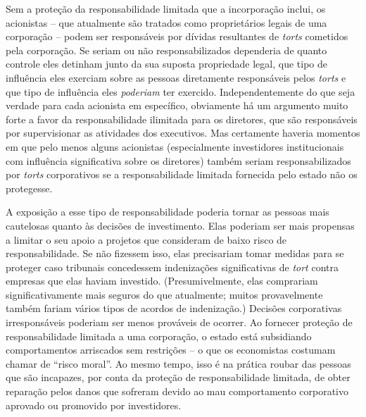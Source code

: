 Sem a proteção da responsabilidade limitada que a incorporação inclui, os acionistas -- que atualmente são tratados como proprietários legais de uma corporação -- podem ser responsáveis por dívidas resultantes de \emph{torts} cometidos pela corporação. Se seriam ou não responsabilizados dependeria de quanto controle eles detinham junto da sua suposta propriedade legal, que tipo de influência eles exerciam sobre as pessoas diretamente responsáveis pelos \emph{torts} e que tipo de influência eles \emph{poderiam} ter exercido. Independentemente do que seja verdade para cada acionista em específico, obviamente há um argumento muito forte a favor da responsabilidade ilimitada para os diretores, que são responsáveis por supervisionar as atividades dos executivos. Mas certamente haveria momentos em que pelo menos alguns acionistas (especialmente investidores institucionais com influência significativa sobre os diretores) também seriam responsabilizados por \emph{torts} corporativos se a responsabilidade limitada fornecida pelo estado não os protegesse.

A exposição a esse tipo de responsabilidade poderia tornar as pessoas mais cautelosas quanto às decisões de investimento. Elas poderiam ser mais propensas a limitar o seu apoio a projetos que consideram de baixo risco de responsabilidade. Se não fizessem isso, elas precisariam tomar medidas para se proteger caso tribunais concedessem indenizações significativas de \emph{tort} contra empresas que elas haviam investido. (Presumivelmente, elas comprariam significativamente mais seguros do que atualmente; muitos provavelmente também fariam vários tipos de acordos de indenização.) Decisões corporativas irresponsáveis poderiam ser menos prováveis de ocorrer. Ao fornecer proteção de responsabilidade limitada a uma corporação, o estado está subsidiando comportamentos arriscados sem restrições -- o que os economistas costumam chamar de ``risco moral''. Ao mesmo tempo, isso é na prática roubar das pessoas que são incapazes, por conta da proteção de responsabilidade limitada, de obter reparação pelos danos que sofreram devido ao mau comportamento corporativo aprovado ou promovido por investidores. 

